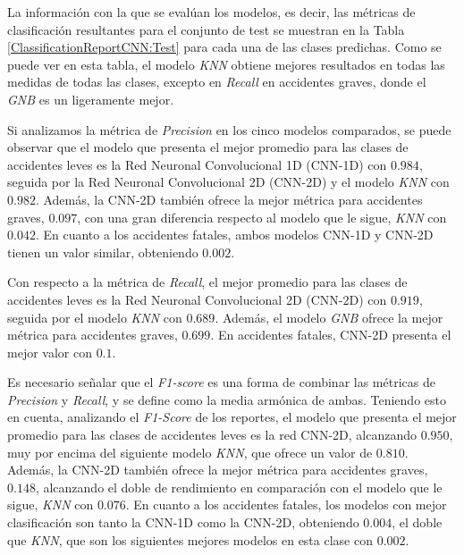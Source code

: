 

La información con la que se evalúan los modelos, es decir, las métricas de clasificación resultantes para el conjunto de test se muestran en la Tabla \ref{ClassificationReportCNN:Test} para cada una de las clases predichas. Como se puede ver en esta tabla, el modelo \textit{KNN} obtiene mejores resultados en todas las medidas de todas las clases, excepto en \textit{Recall} en accidentes graves, donde el \textit{GNB} es un ligeramente mejor.

Si analizamos la métrica de \textit{Precision} en los cinco modelos comparados, se puede observar que el modelo que presenta el mejor promedio para las clases de accidentes leves es la Red Neuronal Convolucional 1D (CNN-1D) con $0.984$, seguida por la Red Neuronal Convolucional 2D (CNN-2D) y el modelo \textit{KNN} con $0.982$. Además, la CNN-2D también ofrece la mejor métrica para accidentes graves, $0.097$, con una gran diferencia respecto al modelo que le sigue, \textit{KNN} con $0.042$. En cuanto a los accidentes fatales, ambos modelos CNN-1D y CNN-2D tienen un valor similar, obteniendo $0.002$.

Con respecto a la métrica de \textit{Recall}, el mejor promedio para las clases de accidentes leves es la Red Neuronal Convolucional 2D (CNN-2D) con $0.919$, seguida por el modelo \textit{KNN} con $0.689$. Además, el modelo \textit{GNB} ofrece la mejor métrica para accidentes graves, $0.699$. En accidentes fatales, CNN-2D presenta el mejor valor con $0.1$.

Es necesario señalar que el \textit{F1-score} es una forma de combinar las métricas de \textit{Precision} y \textit{Recall}, y se define como la media armónica de ambas. Teniendo esto en cuenta, analizando el \textit{F1-Score} de los reportes, el modelo que presenta el mejor promedio para las clases de accidentes leves es la red CNN-2D, alcanzando $0.950$, muy por encima del siguiente modelo \textit{KNN}, que ofrece un valor de $0.810$. Además, la CNN-2D también ofrece la mejor métrica para accidentes graves, $0.148$, alcanzando el doble de rendimiento en comparación con el modelo que le sigue, \textit{KNN} con $0.076$. En cuanto a los accidentes fatales, los modelos con mejor clasificación son tanto la CNN-1D como la CNN-2D, obteniendo $0.004$, el doble que \textit{KNN}, que son los siguientes mejores modelos en esta clase con $0.002$.

